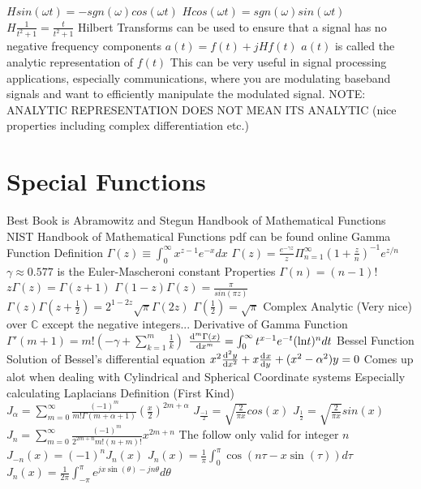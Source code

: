 \documentclass[14pt]{extarticle}
\begin{document}
\begin{outline}
					\3	$H sin(\omega t) = -sgn(\omega) cos(\omega t)$
					\3	$H cos(\omega t) = sgn(\omega) sin(\omega t)$
					\3	$H \frac{1}{t^2 + 1} = \frac{t}{t^2 + 1}$
				\2	Hilbert Transforms can be used to ensure that a signal has no
						negative frequency components
					\3	$a(t) = f(t) + j Hf(t)$
					\3	$a(t)$ is called the analytic representation of $f(t)$
					\3	This can be very useful in signal processing applications, 
							especially communications, where you are modulating baseband
							signals and want to efficiently manipulate the modulated signal.
					\3	NOTE: ANALYTIC REPRESENTATION DOES NOT MEAN ITS ANALYTIC (nice properties
							including complex differentiation etc.)
		\section*{Special Functions}
			\1	Best Book is Abramowitz and Stegun Handbook of Mathematical Functions
			\1	NIST Handbook of Mathematical Functions pdf can be found online
			\1	Gamma Function
				\2	Definition
					\3	$\Gamma(z) \equiv \int_0^{\infty} x^{z-1} e^{-x} dx$
					\3	$\Gamma(z) = \frac{e^{-\gamma z}}{z}\Pi_{n=1}^{\infty} (1 + \frac{z}{n})^{-1} e^{z/n}$
						\4	$\gamma \approx 0.577$ is the Euler-Mascheroni constant
				\2	Properties
					\3	$\Gamma(n) = (n-1)!$
					\3	$z \Gamma(z) = \Gamma(z+1)$	
					\3	$\Gamma(1-z)\Gamma(z) = \frac{\pi}{sin(\pi z)}$
					\3	$\Gamma(z)\Gamma(z+\frac{1}{2}) = 2^{1 - 2z} \sqrt{\pi} \Gamma(2z)$
					\3	$\Gamma(\frac{1}{2}) = \sqrt{\pi}$
					\3	Complex Analytic (Very nice) over $\mathbb{C}$ except the negative integers...
				\2	Derivative of Gamma Function
					\3	$\Gamma'(m+1) = m!(-\gamma + \sum_{k=1}^m \frac{1}{k})$
					\3	$\od[m]{\Gamma(x)}{x} = \int_0^{\infty} t^{x-1}e^{-t}(\text{ln} t)^n dt$
			\1	Bessel Function
				\2	Solution of Bessel's differential equation
					\3	$x^2 \od[2]{y}{x} + x \od{x}{y} + (x^2 - \alpha^2)y = 0$
					\3	Comes up alot when dealing with Cylindrical and Spherical Coordinate systems
					\3	Especially calculating Laplacians
				\2	Definition (First Kind)
					\3	$J_{\alpha} = \sum_{m=0}^{\infty} \frac{(-1)^m}{m! \Gamma(m + \alpha + 1)} (\frac{x}{2})^{2m+\alpha}$	
					\3	$J_{\frac{-1}{2}} = \sqrt{\frac{2}{\pi x}} cos(x)$
					\3	$J_{\frac{1}{2}} = \sqrt{\frac{2}{\pi x}} sin(x)$
					\3	$J_{n} = \sum_{m=0}^{\infty} \frac{(-1)^m}{2^{2m + n} m! (n + m)!}x^{2m + n}$
						\4	The follow only valid for integer $n$
					\3	$J_{-n}(x) = (-1)^nJ_n(x)$
					\3	$J_n(x) = \frac{1}{\pi}\int_0^{\pi} \cos(n \tau - x \sin(\tau))d\tau$
					\3	$J_n(x) = \frac{1}{2 \pi} \int_{-\pi}^{\pi} e^{jx \sin(\theta) - j n \theta}d\theta$

\end{outline}
\end{document}
